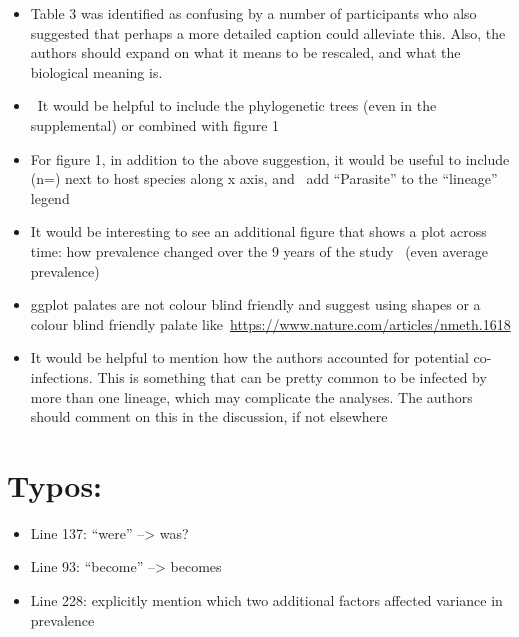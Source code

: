 \documentclass[10pt]{article}
\providecommand{\tightlist}{\setlength{\itemsep}{0pt}\setlength{\parskip}{0pt}}%
\begin{document}
{\label{657196}}

\begin{itemize}
\tightlist
\item
  Table 3 was identified as confusing by a number of participants who
  also suggested that perhaps a more detailed caption could alleviate
  this. Also, the authors should expand on what it means to be rescaled,
  and what the biological meaning is.
\item
  ~It would be helpful to include the phylogenetic trees (even in the
  supplemental) or combined with figure 1
\item
  For figure 1, in addition to the above suggestion, it would be useful
  to include (n=) next to host species along x axis, and~ add
  ``Parasite'' to the ``lineage'' legend
\item
  It would be interesting to see an additional figure that shows a plot
  across time: how prevalence changed over the 9 years of the study~
  (even average prevalence)
\item
  ggplot palates are not colour blind friendly and suggest using shapes
  or a colour blind friendly palate
  like~\url{https://www.nature.com/articles/nmeth.1618}
\item
  It would be helpful to mention how the authors accounted for potential
  co-infections. This is something that can be pretty common to be
  infected by more than one lineage, which may complicate the analyses.
  The authors should comment on this in the discussion, if not elsewhere
\end{itemize}

\section*{Typos:}

{\label{520965}}

\begin{itemize}
\tightlist
\item
  Line 137: ``were'' --\textgreater{} was?
\end{itemize}

\par\null

\begin{itemize}
\tightlist
\item
  Line 93: ``become'' --\textgreater{} becomes
\end{itemize}

\begin{itemize}
\tightlist
\item
  Line 228: explicitly mention which two additional factors affected
  variance in prevalence
\end{itemize}
\end{document}
